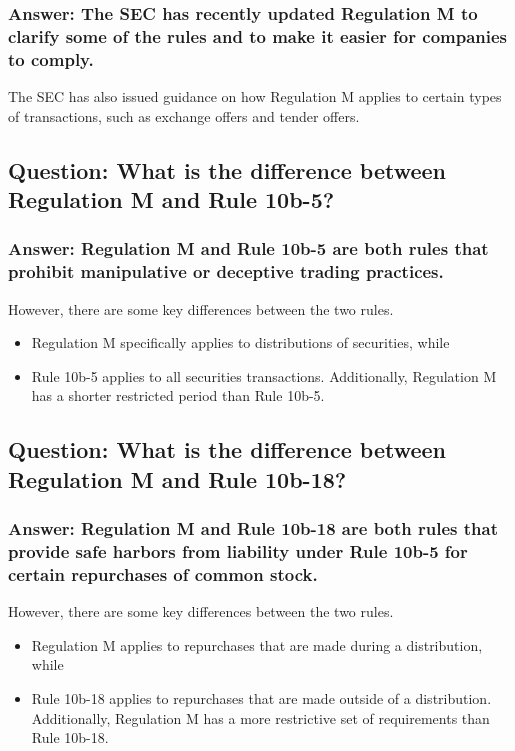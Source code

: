 \documentclass[11pt]{article}
\begin{document}
\subsubsection{Answer: The SEC has recently updated Regulation M to clarify some of the rules and to make it easier for companies to comply.}
\label{sec:orgaae8e9f}
The SEC has also issued guidance on how Regulation M applies to certain types of transactions, such as exchange offers and tender offers.

\subsection{Question: What is the difference between Regulation M and Rule 10b-5?}
\label{sec:org06b8894}

\subsubsection{Answer: Regulation M and Rule 10b-5 are both rules that prohibit manipulative or deceptive trading practices.}
\label{sec:org2bedfb2}
However, there are some key differences between the two rules.
\begin{itemize}
\item Regulation M specifically applies to distributions of securities, while
\item Rule 10b-5 applies to all securities transactions.
Additionally, Regulation M has a shorter restricted period than Rule 10b-5.
\end{itemize}

\subsection{Question: What is the difference between Regulation M and Rule 10b-18?}
\label{sec:org1f7c666}

\subsubsection{Answer: Regulation M and Rule 10b-18 are both rules that provide safe harbors from liability under Rule 10b-5 for certain repurchases of common stock.}
\label{sec:orgf6643b6}
However, there are some key differences between the two rules.
\begin{itemize}
\item Regulation M applies to repurchases that are made during a distribution, while
\item Rule 10b-18 applies to repurchases that are made outside of a distribution.
Additionally, Regulation M has a more restrictive set of requirements than Rule 10b-18.
\end{itemize}
\end{document}
